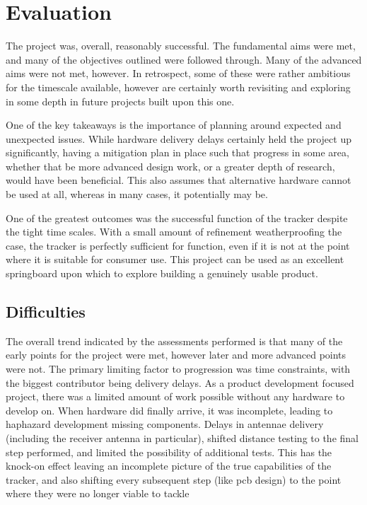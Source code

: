 \section{Evaluation}
The project was, overall, reasonably successful. 
The fundamental aims were met, and many of the objectives outlined were 
followed through. Many of the advanced aims were not met, however. 
In retrospect, some of these were rather ambitious for the timescale 
available, however are certainly worth revisiting and exploring in 
some depth in future projects built upon this one. 

One of the key takeaways is the importance of planning around expected and unexpected issues. 
While hardware delivery delays certainly held the project up significantly, having a mitigation plan 
in place such that progress in some area, whether that be more advanced design work, or a greater 
depth of research, would have been beneficial. This also assumes that alternative hardware cannot be used
at all, whereas in many cases, it potentially may be. 

One of the greatest outcomes was the successful function of the tracker despite the tight time scales.
With a small amount of refinement weatherproofing the case, the tracker is perfectly sufficient 
for function, even if it is not at the point where it is suitable for consumer use. This project 
can be used as an excellent springboard upon which to explore building a genuinely usable product. 

\subsection{Difficulties}
The overall trend indicated by the assessments performed is that many of the early points for the project 
were met, however later and more advanced points were not. The primary limiting factor to progression 
was time constraints, with the biggest contributor being delivery delays. 
As a product development focused project, there was a limited amount of work possible 
without any hardware to develop on. When hardware did finally arrive, it was incomplete,
leading to haphazard development missing components. Delays in antennae delivery (including the 
receiver antenna in particular), shifted distance testing to the final step performed, and limited 
the possibility of additional tests. This has the knock-on effect leaving an incomplete picture 
of the true capabilities of the tracker, and also shifting every subsequent step (like \acrshort{pcb} design)
to the point where they were no longer viable to tackle

